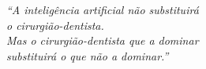 
\begin{epigrafe}
  \vspace*{\fill}
  \begin{flushright}
    \textit{``A inteligência artificial não substituirá \\
    o cirurgião-dentista. \\
    Mas o cirurgião-dentista que a dominar \\
    substituirá o que não a dominar.''}
  \end{flushright}
\end{epigrafe}
